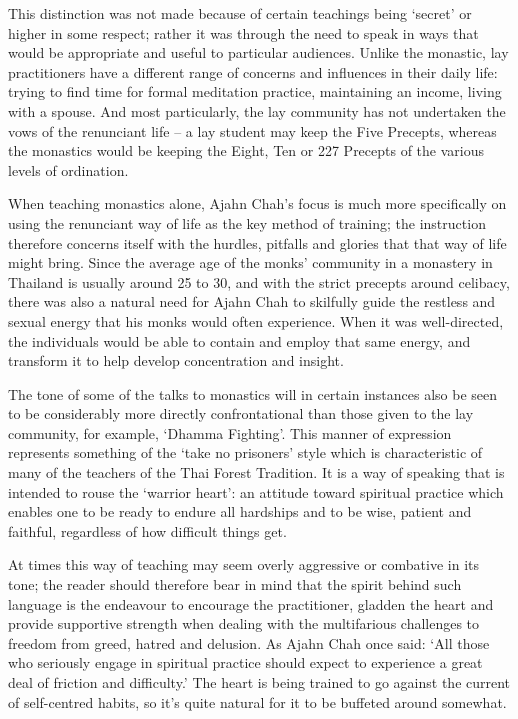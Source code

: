 This distinction was not made because of certain teachings being `secret' or higher in some respect; rather it was through the need to speak in ways that would be appropriate and useful to particular audiences. Unlike the monastic, lay practitioners have a different range of concerns and influences in their daily life: trying to find time for formal meditation practice, maintaining an income, living with a spouse. And most particularly, the lay community has not undertaken the vows of the renunciant life -- a lay student may keep the Five Precepts, whereas the monastics would be keeping the Eight, Ten or 227 Precepts of the various levels of ordination. 

When teaching monastics alone, Ajahn Chah's focus is much more specifically on using the renunciant way of life as the key method of training; the instruction therefore concerns itself with the hurdles, pitfalls and glories that that way of life might bring. Since the average age of the monks' community in a monastery in Thailand is usually around 25 to 30, and with the strict precepts around celibacy, there was also a natural need for Ajahn Chah to skilfully guide the restless and sexual energy that his monks would often experience. When it was well-directed, the individuals would be able to contain and employ that same energy, and transform it to help develop concentration and insight. 

The tone of some of the talks to monastics will in certain instances also be seen to be considerably more directly confrontational than those given to the lay community, for example, `Dhamma Fighting'. This manner of expression represents something of the `take no prisoners' style which is characteristic of many of the teachers of the Thai Forest Tradition. It is a way of speaking that is intended to rouse the `warrior heart': an attitude toward spiritual practice which enables one to be ready to endure all hardships and to be wise, patient and faithful, regardless of how difficult things get.

At times this way of teaching may seem overly aggressive or combative in its tone; the reader should therefore bear in mind that the spirit behind such language is the endeavour to encourage the practitioner, gladden the heart and provide supportive strength when dealing with the multifarious challenges to freedom from greed, hatred and delusion. As Ajahn Chah once said: `All those who seriously engage in spiritual practice should expect to experience a great deal of friction and difficulty.' The heart is being trained to go against the current of self-centred habits, so it's quite natural for it to be buffeted around somewhat. 

